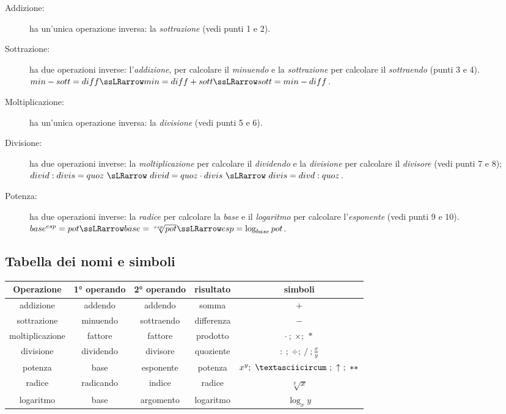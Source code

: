 \begin{description} %
\item [Addizione:] ha un'unica operazione inversa: 
la \emph{sottrazione} 
(vedi punti 1 e 2). 
\item [Sottrazione:] ha due operazioni inverse: 
l'\emph{addizione}, per calcolare il \emph{minuendo} e 
la \emph{sottrazione} per calcolare il \emph{sottraendo} 
(punti 3 e 4). \\
\(min-sott = diff \ssLRarrow min = diff+sott \ssLRarrow sott = min-diff\).
\item [Moltiplicazione:] ha un'unica operazione inversa: 
la \emph{divisione} 
(vedi punti 5 e 6). 
\item [Divisione:] ha due operazioni inverse: 
la \emph{moltiplicazione} per calcolare il \emph{dividendo} e 
la \emph{divisione} per calcolare il \emph{divisore} 
(vedi punti 7 e 8); \\
\(divid : divis = quoz ~\sLRarrow~ divid = quoz \cdot divis ~\sLRarrow~ 
divis = divd : quoz\). 
\item [Potenza:] ha due operazioni inverse: 
la \emph{radice} per calcolare la \emph{base} e 
il \emph{logaritmo} per calcolare l'\emph{esponente} 
(vedi punti 9 e 10). \\
\(base^{esp} = pot \ssLRarrow base = \sqrt[esp]{pot} \ssLRarrow 
esp = \log_{base}{pot}\). 
\end{description}


\subsection{Tabella dei nomi e simboli}

\begin{center}
\begin{tabular}{ccccc}
Operazione & 1° operando & 2° operando & risultato & simboli\\ \hline %
addizione & addendo & addendo & somma & \(+\) \\
sottrazione & minuendo & sottraendo & differenza & \(-\) \\
moltiplicazione & fattore & fattore & prodotto & \(\cdot~;~\times;~*\) \\
divisione & dividendo & divisore & quoziente & 
\(:~;~\div;~/~; \frac{x}{y}\) \\
potenza & base & esponente & potenza & 
\(x^y;~\textasciicircum~;~\uparrow~;~**\) \\
radice & radicando & indice & radice & \(\sqrt[y]{x}\) \\
logaritmo & base & argomento & logaritmo & \(\log_{x}{y}\) \\
\hline
\end{tabular}
\end{center}


